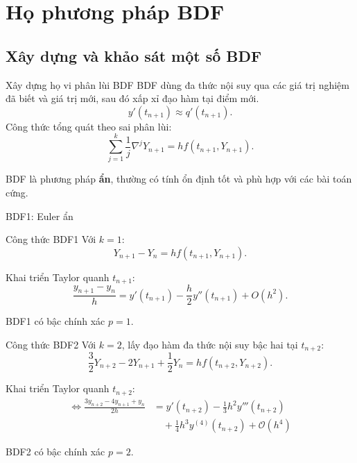 \documentclass[aspectratio=43]{beamer}
\begin{document}
\section{Họ phương pháp BDF}
\subsection*{Xây dựng và khảo sát một số BDF}
\begin{frame}
\begin{baitapbox}{Xây dựng họ vi phân lùi BDF}
BDF dùng đa thức nội suy qua các giá trị nghiệm đã biết và giá trị mới, sau đó xấp xỉ đạo hàm tại điểm mới.
\[
 y'(t_{n+1})\approx q'(t_{n+1}).
\]
Công thức tổng quát theo sai phân lùi:
\[
 \sum_{j=1}^{k}\frac{1}{j}\nabla^jY_{n+1}=hf(t_{n+1},Y_{n+1}).
\]
\end{baitapbox}
\begin{tcolorbox}[title={Đặc điểm}, colback=softgreen, colframe=tealgreen, colbacktitle=tealgreen]
BDF là phương pháp \textbf{ẩn}, thường có tính ổn định tốt và phù hợp với các bài toán cứng.
\end{tcolorbox}
\end{frame}

\begin{frame}{BDF1: Euler ẩn}
\begin{baitapbox}{Công thức BDF1}
Với $k=1$:
\[
 Y_{n+1}-Y_n=hf(t_{n+1},Y_{n+1}).
\]

Khai triển Taylor quanh $t_{n+1}$:
\[
 \frac{y_{n+1}-y_n}{h}=y'(t_{n+1})-\frac{h}{2}y''(t_{n+1})+O(h^2).
\]
\end{baitapbox}
\begin{tcolorbox}[title={Kết luận}, colback=softgreen, colframe=tealgreen, colbacktitle=tealgreen]
BDF1 có bậc chính xác $p=1$.
\end{tcolorbox}
\end{frame}

\begin{frame}
\begin{baitapbox}{Công thức BDF2}
Với $k=2$, lấy đạo hàm đa thức nội suy bậc hai tại $t_{n+2}$:
\[
 \frac{3}{2}Y_{n+2}-2Y_{n+1}+\frac{1}{2}Y_n=hf(t_{n+2},Y_{n+2}).
\]

Khai triển Taylor quanh $t_{n+2}$:
\begin{align*}
    \Leftrightarrow \frac{3y_{n+2} - 4y_{n+1} + y_n}{2h} &= y'(t_{n+2}) - \frac{1}{3}h^2 y'''(t_{n+2}) \\
    &\quad + \frac{1}{4}h^3 y^{(4)}(t_{n+2}) + \mathcal{O}(h^4)
\end{align*}


\end{baitapbox}
\begin{tcolorbox}[title={Kết luận}, colback=softgreen, colframe=tealgreen, colbacktitle=tealgreen]
BDF2 có bậc chính xác $p=2$.
\end{tcolorbox}
\end{frame}
\end{document}
